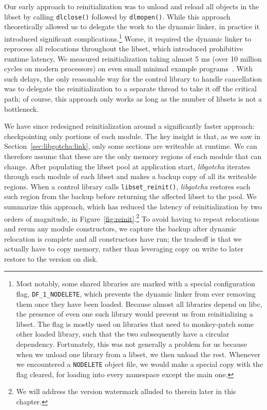 Our early approach to reinitialization was to unload and reload all objects in the
libset by calling \texttt{dlclose()} followed by \texttt{dlmopen()}.  While this
approach theoretically allowed us to delegate the work to the dynamic linker, in
practice it introduced significant complications.\footnote{Most notably, some shared
libraries are marked with a special configuration flag, \texttt{DF\_1\_NODELETE},
which prevents the dynamic linker from ever removing them once they have been loaded.
Because almost all libraries depend on libc, the presence of even one such library
would prevent us from reinitializing a libset.  The flag is mostly used on libraries
that need to monkey-patch some other loaded library, such that the two subsequently
have a circular dependency.  Fortunately, this was not generally a problem for us
because when we unload one library from a libset, we then unload the rest.  Whenever
we encountered a \texttt{NODELETE} object file, we would make a special copy with the
flag cleared, for loading into every namespace except the main one.}  Worse, it
required the dynamic linker to reprocess all relocations throughout the libset, which
introduced prohibitive runtime latency.  We measured reinitialization taking almost 5
ms (over 10 million cycles on modern processors) on even small minimal example
programs~\cite{boucher:atc2020}.  With such delays, the only reasonable way for the
control library to handle cancellation was to delegate the reinitialization to a
separate thread to take it off the critical path; of course, this approach only works
as long as the number of libsets is not a bottleneck.

We have since redesigned reinitialization around a significantly faster approach:\@
checkpointing only portions of each module.  The key insight is that, as we saw in
Section~\ref{sec:libgotcha:link}, only some sections are writeable at runtime.  We
can therefore assume that these are the only memory regions of each module that can
change.  After populating the libset pool at application start, \textit{libgotcha}
iterates through each module of each libset and makes a backup copy of all its
writeable regions.  When a control library calls \texttt{libset\_reinit()},
\textit{libgotcha} restores each such region from the backup before returning the
affected libset to the pool.  We summarize this approach, which has reduced the
latency of reinitialization by two orders of magnitude, in
Figure~\ref{fig:reinit}.\footnote{We will address the version watermark alluded to
therein later in this chapter.}  To avoid having to repeat relocations and rerun any
module constructors, we capture the backup after dynamic relocation is complete and
all constructors have run; the tradeoff is that we actually have to copy memory,
rather than leveraging copy on write to later restore to the version on disk.

